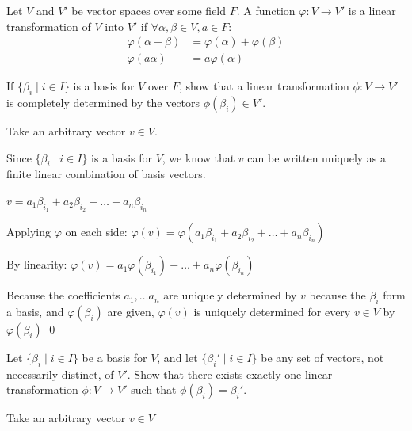 \documentclass{article}
\begin{document}
\begin{problem}[30.24]
    Let $V$ and $V'$ be vector spaces over some field $F$. A function $\varphi \colon V \to V'$ is a linear transformation of $V$ into $V'$ if $\forall \alpha, \beta \in V, a \in F$:
    \begin{align*}
        \varphi(\alpha + \beta) &= \varphi(\alpha) + \varphi(\beta) \\
        \varphi(a\alpha) &= a\varphi(\alpha)
    \end{align*}
    \begin{subproblem}
        \item If $\{\beta_i \mid i \in I\}$ is a basis for $V$ over $F$, show that a linear transformation $\phi \colon V \to V'$ is completely determined by the vectors $\phi(\beta_i) \in V'$.
    \end{subproblem}
    \begin{solution}
        Take an arbitrary vector $v \in V$. 

        Since $\{\beta_i \mid i \in I\}$ is a basis for $V$, we know that $v$ can be written uniquely as a finite linear combination of basis vectors.

        $v = a_1\beta_{i_1} + a_2 \beta_{i_2} + \dots + a_n \beta_{i_n}$

        Applying $\varphi$ on each side: 
        $\varphi(v) = \varphi(a_1\beta_{i_1} + a_2 \beta_{i_2} + \dots + a_n \beta_{i_n})$

        By linearity:
        $\varphi(v) = a_1 \varphi(\beta_{i_1}) + \dots + a_n \varphi(\beta_{i_n})$

        Because the coefficients $a_1, \dots a_n$ are uniquely determined by $v$ because the $\beta_i$ form a basis, and $\varphi(\beta_i)$ are given, $\varphi(v)$ is uniquely determined for every $v \in V$ by $\varphi(\beta_i)$ \qed  
        \end{solution} 
        \begin{subproblem}[resume]
            \item Let $\{\beta_i \mid i \in I\}$ be a basis for $V$, and let
            $\{\beta_i' \mid i \in I\}$ be any set of vectors, not necessarily
            distinct, of $V'$. Show that there exists exactly one linear
            transformation $\phi \colon V \to V'$ such that
            $\phi(\beta_i) = \beta_i'$.
        \end{subproblem}
        \begin{solution}
            Take an arbitrary vector $v \in V$
            

\end{solution}
\end{problem}
\end{document}
